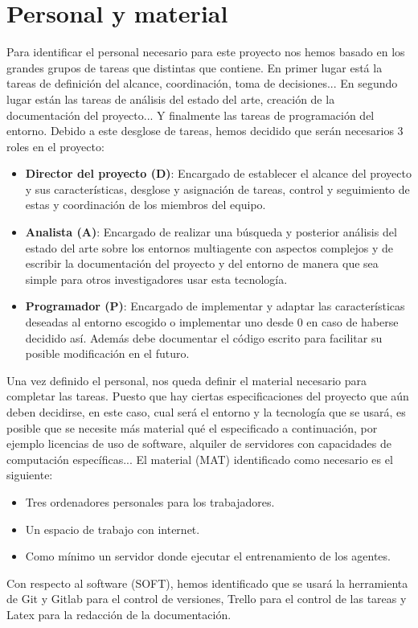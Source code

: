 \section{Personal y material}
Para identificar el personal necesario para este proyecto nos hemos basado en los grandes grupos de tareas que distintas que contiene. En primer lugar está la tareas de definición del alcance, coordinación, toma de decisiones... En segundo lugar están las tareas de análisis del estado del arte, creación de la documentación del proyecto... Y finalmente las tareas de programación del entorno. Debido a este desglose de tareas, hemos decidido que serán necesarios 3 roles en el proyecto:
\begin{itemize}
    \item \textbf{Director del proyecto (D)}: Encargado de establecer el alcance del proyecto y sus características, desglose y asignación de tareas, control y seguimiento de estas y coordinación de los miembros del equipo.
    \item \textbf{Analista (A)}: Encargado de realizar una búsqueda y posterior análisis del estado del arte sobre los entornos multiagente con aspectos complejos y de escribir la documentación del proyecto y del entorno de manera que sea simple para otros investigadores usar esta tecnología.
    \item \textbf{Programador (P)}: Encargado de implementar y adaptar las características deseadas al entorno escogido o implementar uno desde 0 en caso de haberse decidido así. Además debe documentar el código escrito para facilitar su posible modificación en el futuro.  
\end{itemize}
 
 Una vez definido el personal, nos queda definir el material necesario para completar las tareas. Puesto que hay ciertas especificaciones del proyecto que aún deben decidirse, en este caso, cual será el entorno y la tecnología que se usará, es posible que se necesite más material qué el especificado a continuación, por ejemplo licencias de uso de software, alquiler de servidores con capacidades de computación específicas...
 El material (MAT) identificado como necesario es el siguiente:
 \begin{itemize}
     \item Tres ordenadores personales para los trabajadores.
     \item Un espacio de trabajo con internet.
     \item Como mínimo un servidor donde ejecutar el entrenamiento de los agentes.
 \end{itemize}
 
 Con respecto al software (SOFT), hemos identificado que se usará la herramienta de Git y Gitlab para el control de versiones, Trello para el control de las tareas y Latex para la redacción de la documentación.